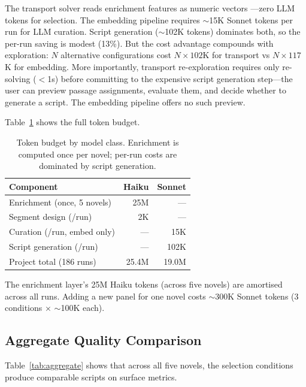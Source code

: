 \documentclass[final]{clv2025}
\begin{document}
The transport solver reads enrichment features as numeric vectors
---zero LLM tokens for selection.  The embedding pipeline requires
$\sim$15K Sonnet tokens per run for LLM curation.  Script generation
($\sim$102K tokens) dominates both, so the per-run saving is modest
(13\%).  But the cost advantage compounds with exploration: $N$
alternative configurations cost $N \times 102$K for transport vs
$N \times 117$K for embedding.  More importantly, transport
re-exploration requires only re-solving ($<$1s) before committing to
the expensive script generation step---the user can preview passage
assignments, evaluate them, and decide whether to generate a script.
The embedding pipeline offers no such preview.

Table~\ref{tab:cost} shows the full token budget.

\begin{table}[t]
\caption{Token budget by model class.  Enrichment is computed once per
  novel; per-run costs are dominated by script generation.}
\label{tab:cost}
\begin{tabular}{lrr}
\toprule
Component & Haiku & Sonnet \\
\midrule
Enrichment (once, 5 novels)   & 25M & --- \\
Segment design (/run)  & 2K & --- \\
Curation (/run, embed only) & --- & 15K \\
Script generation (/run) & --- & 102K \\
\midrule
Project total (186 runs) & 25.4M & 19.0M \\
\bottomrule
\end{tabular}
\end{table}

The enrichment layer's 25M Haiku tokens (across five novels) are
amortised across all runs.  Adding a new panel for one novel costs
$\sim$300K Sonnet tokens (3 conditions $\times$ $\sim$100K each).


\subsection{Aggregate Quality Comparison}
\label{sec:aggregate}

Table~\ref{tab:aggregate} shows that across all five novels, the
selection conditions produce comparable scripts on surface metrics.
\end{document}
